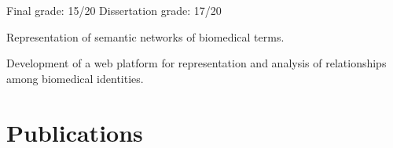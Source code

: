 \documentclass[]{andre-vechina-resume}
\begin{document}
Final grade: {\color{subheadings} 15/20} \tdot Dissertation grade: {\color{subheadings} 17/20}\\
\begin{tightemize}
\item
Representation of semantic networks of biomedical terms.
\item
Development of a web platform for representation and analysis of relationships among biomedical identities.
\end{tightemize}

\section{Publications}



\nocite{*}
\end{document}
